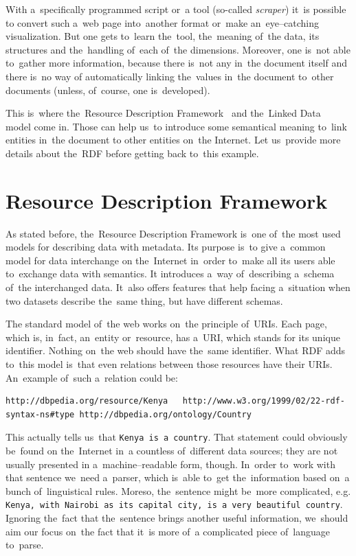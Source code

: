 With a~specifically programmed script or~a tool (so-called \emph{scraper}) it~is possible to
convert such a~web page into~another format or~make an~eye--catching visualization.
But one gets to~learn the~tool, the~meaning of~the data, its structures and the~handling of~each of~the dimensions. Moreover, one is~not able to~gather more information,
because there is~not any in~the document itself and there is~no way of
automatically linking the~values in~the document to~other documents (unless, of~course,
one is~developed).

This is~where the~Resource Description Framework~\cite{rdf} and the~Linked Data~\cite{ld}
model come in. Those
can help us~to introduce some semantical meaning to~link entities in~the document to
other entities on~the Internet. Let us~provide more details about the~RDF before getting
back to~this example.

\section{Resource Description Framework}
As stated before, the~Resource Description Framework is~one of~the most used models for
describing data with metadata. Its purpose is~to give a~common model for data interchange
on the~Internet in~order to~make all its users able to~exchange data with semantics.
It introduces a~way of~describing a~schema of~the interchanged data. It~also 
offers features that help facing a~situation when two datasets describe the~same thing,
but have different schemas.

The standard model of~the web works on~the principle of~URIs. Each page, which is, in~fact,
an~entity or~resource, has a~URI, which stands for its unique identifier. Nothing on~the web
should have the~same identifier. What RDF adds to~this model is~that even relations
between those resources have their URIs. An~example of~such a~relation could be:

\tiny\begin{verbatim}
http://dbpedia.org/resource/Kenya   http://www.w3.org/1999/02/22-rdf-syntax-ns#type http://dbpedia.org/ontology/Country  
\end{verbatim}\normalsize

This actually tells us~that \texttt{Kenya is~a country}. That statement could obviously be~found on
the~Internet in~a countless of~different data sources; they are not usually presented
in a~machine--readable form, though. In~order to~work with that sentence we~need a~parser, which is~able to~get the~information based on~a bunch of~linguistical rules.
Moreso, the~sentence might be~more complicated, e.g. \texttt{Kenya, with Nairobi as~its capital city,
is a~very beautiful country}. Ignoring the~fact that the~sentence brings another useful
information, we~should aim our focus on~the fact that it~is more of~a complicated piece of~language to~parse. 

